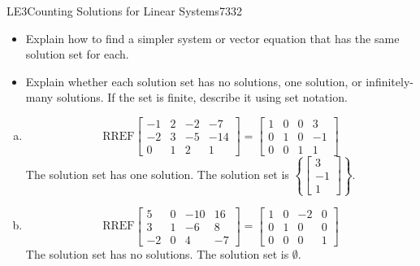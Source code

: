 \begin{exercise}{LE3}{Counting Solutions for Linear Systems}{7332}
\begin{exerciseStatement}
\begin{enumerate}[(a)]
 
\end{enumerate}

     

\begin{itemize}
\item  

 Explain how to find a simpler system or vector equation that has the same solution set for each. 

 
\item  

 Explain whether each solution set has no solutions, one solution, or infinitely-many solutions. If the set is finite, describe it using set notation. 

 
\end{itemize}

     \end{exerciseStatement}
 \begin{exerciseAnswer} 

\begin{enumerate}[(a)]
\item  

 \[\mathrm{RREF}\left[\begin{array}{ccc|c}
-1 & 2 & -2 & -7 \\
-2 & 3 & -5 & -14 \\
0 & 1 & 2 & 1
\end{array}\right]=\left[\begin{array}{ccc|c}
1 & 0 & 0 & 3 \\
0 & 1 & 0 & -1 \\
0 & 0 & 1 & 1
\end{array}\right]\] The solution set has one solution. The solution set is \(\left\{ \left[\begin{array}{c}
3 \\
-1 \\
1
\end{array}\right] \right\}\). 

 
\item  

 \[\mathrm{RREF}\left[\begin{array}{ccc|c}
5 & 0 & -10 & 16 \\
3 & 1 & -6 & 8 \\
-2 & 0 & 4 & -7
\end{array}\right]=\left[\begin{array}{ccc|c}
1 & 0 & -2 & 0 \\
0 & 1 & 0 & 0 \\
0 & 0 & 0 & 1
\end{array}\right]\] The solution set has no solutions. The solution set is \(\emptyset\). 


\end{enumerate}
\end{exerciseAnswer}
\end{exercise}
